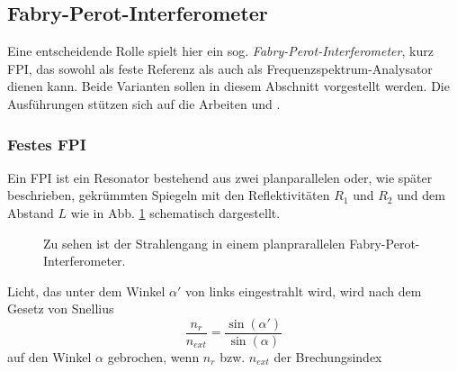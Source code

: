 \subsection{Fabry-Perot-Interferometer}\label{subsec:fabry-perot-interferometer}
Eine entscheidende Rolle spielt hier ein sog.
\textit{Fabry-Perot-Interferometer}, kurz FPI, das sowohl
als feste Referenz als auch als Frequenzspektrum-Analysator dienen kann.
Beide Varianten sollen in diesem Abschnitt vorgestellt werden. Die Ausführungen
stützen sich auf die Arbeiten \cite{wiche:1997:diplomarbeit} und
\cite{kuschnick:2000:diplomarbeit}.

\subsubsection{Festes FPI}\label{subsubsec:festes_FPI}
Ein FPI ist ein Resonator bestehend aus zwei planparallelen oder, wie später
beschrieben, gekrümmten Spiegeln mit den Reflektivitäten $R_1$ und $R_2$ und dem
Abstand $L$ wie in Abb.
\ref{fig:FPI_planparallel} schematisch dargestellt.
\begin{figure}[h]
 	\centering
	\caption[FPI - planparallel]{Zu sehen ist der Strahlengang in einem
	planprarallelen Fabry-Perot-Interferometer.}\label{fig:FPI_planparallel}
\end{figure}
Licht, das unter dem Winkel
$\alpha'$ von links eingestrahlt wird, wird nach dem Gesetz von Snellius
\begin{equation}\label{eq:snellius}
	\frac{n_r}{n_{ext}}=\frac{\sin{(\alpha')}}{\sin{(\alpha)}}
\end{equation}
auf den Winkel $\alpha$ gebrochen, wenn $n_r$ bzw. $n_{ext}$ der Brechungsindex
